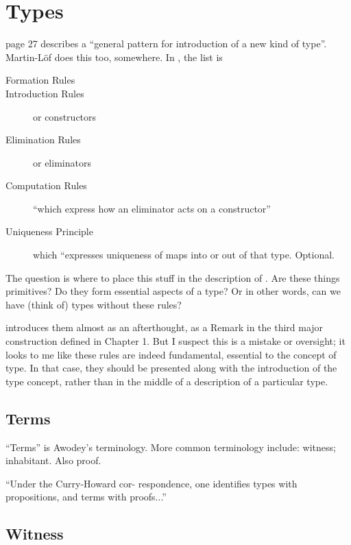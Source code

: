 \chapter{Types}
\label{sect:type}

\HoTTB page 27 describes a ``general pattern for introduction of a new
kind of type''.  Martin-L\"{o}f does this too, somewhere.  In \HoTTB,
the list is

\begin{description}
\item [Formation Rules]
\item [Introduction Rules]  or constructors
\item [Elimination Rules] or eliminators
\item [Computation Rules]  ``which express how an eliminator acts on a constructor''
\item [Uniqueness Principle] which ``expresses uniqueness of maps into
  or out of that type.  Optional.
\end{description}


The question is where to place this stuff in the description of \HoTT.
Are these things primitives?  Do they form essential aspects of a
type?  Or in other words, can we have (think of) types without these rules?

\HoTTB introduces them almost as an afterthought, as a Remark in the
third major construction defined in Chapter 1.  But I suspect this is
a mistake or oversight; it looks to me like these rules are indeed
fundamental, essential to the concept of type.  In that case, they
should be presented along with the introduction of the type concept,
rather than in the middle of a description of a particular type.

\section{Terms}
\label{sect:terms}

\begin{ednote}
  ``Terms'' is Awodey's terminology.  More common terminology include:
  witness; inhabitant.  Also proof.
\end{ednote}

``Under the Curry-Howard cor- respondence, one identifies types
with propositions, and terms with proofs...''\cite{awodey_tth}

\section{Witness}
\label{subs:witness}

